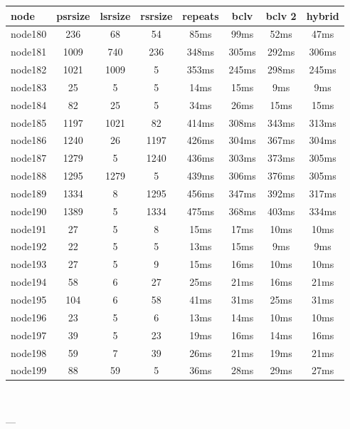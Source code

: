 \begin{tabular}{|l|c|c|c|c|c|c|c|}
\hline node & psrsize & lsrsize & rsrsize   & repeats & bclv & bclv 2 & hybrid\\
    \hline node180 & 236 & 68 & 54 & 85ms & 99ms & 52ms & 47ms\\
    \hline node181 & 1009 & 740 & 236 & 348ms & 305ms & 292ms & 306ms\\
    \hline node182 & 1021 & 1009 & 5 & 353ms & 245ms & 298ms & 245ms\\
    \hline node183 & 25 & 5 & 5 & 14ms & 15ms & 9ms & 9ms\\
    \hline node184 & 82 & 25 & 5 & 34ms & 26ms & 15ms & 15ms\\
    \hline node185 & 1197 & 1021 & 82 & 414ms & 308ms & 343ms & 313ms\\
    \hline node186 & 1240 & 26 & 1197 & 426ms & 304ms & 367ms & 304ms\\
    \hline node187 & 1279 & 5 & 1240 & 436ms & 303ms & 373ms & 305ms\\
    \hline node188 & 1295 & 1279 & 5 & 439ms & 306ms & 376ms & 305ms\\
    \hline node189 & 1334 & 8 & 1295 & 456ms & 347ms & 392ms & 317ms\\
    \hline node190 & 1389 & 5 & 1334 & 475ms & 368ms & 403ms & 334ms\\
    \hline node191 & 27 & 5 & 8 & 15ms & 17ms & 10ms & 10ms\\
    \hline node192 & 22 & 5 & 5 & 13ms & 15ms & 9ms & 9ms\\
    \hline node193 & 27 & 5 & 9 & 15ms & 16ms & 10ms & 10ms\\
    \hline node194 & 58 & 6 & 27 & 25ms & 21ms & 16ms & 21ms\\
    \hline node195 & 104 & 6 & 58 & 41ms & 31ms & 25ms & 31ms\\
    \hline node196 & 23 & 5 & 6 & 13ms & 14ms & 10ms & 10ms\\
    \hline node197 & 39 & 5 & 23 & 19ms & 16ms & 14ms & 16ms\\
    \hline node198 & 59 & 7 & 39 & 26ms & 21ms & 19ms & 21ms\\
    \hline node199 & 88 & 59 & 5 & 36ms & 28ms & 29ms & 27ms\\

\hline
\end{tabular} \

---


